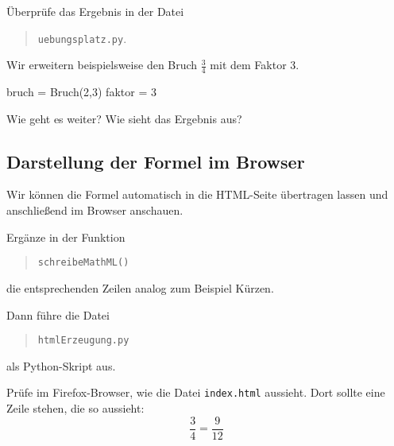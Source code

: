 Überprüfe das Ergebnis in der Datei
\begin{quote}
	\texttt{uebungsplatz.py}.
\end{quote}
Wir erweitern beispielsweise den Bruch $\frac{3}{4}$ mit dem Faktor 3.

\begin{codePython}
bruch = Bruch(2,3)
faktor = 3
\end{codePython}

Wie geht es weiter? Wie sieht das Ergebnis aus?

\subsection*{Darstellung der Formel im Browser}

Wir können die Formel automatisch in die HTML-Seite übertragen lassen und anschließend im Browser anschauen.

Ergänze in der Funktion
\begin{quote}
	\texttt{schreibeMathML()}
\end{quote}
die entsprechenden Zeilen analog zum Beispiel Kürzen.


Dann führe die Datei
\begin{quote}
\texttt{htmlErzeugung.py}
\end{quote} als Python-Skript aus.

Prüfe im Firefox-Browser, wie die Datei \texttt{index.html} aussieht. Dort sollte eine Zeile stehen, die so aussieht:
\[
\frac{3}{4} = \frac{9}{12}
\]